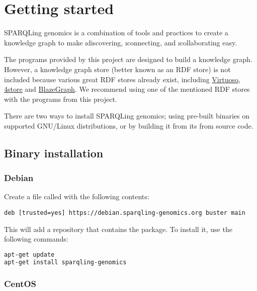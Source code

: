 \chapter{Getting started}

  SPARQLing genomics is a combination of tools and practices to create a
  knowledge graph to make \i{discovering}, \i{connecting}, and
  \i{collaborating} easy.

  The programs provided by this project are designed to build a knowledge graph.
  However, a knowledge graph store (better known as an RDF store) is not included
  because various great RDF stores already exist, including
  \href{https://virtuoso.openlinksw.com/}{Virtuoso},
  \href{https://github.com/4store/4store}{4store} and
  \href{https://www.blazegraph.com/}{BlazeGraph}.  We recommend using one of
  the mentioned RDF stores with the programs from this project.

  There are two ways to install SPARQLing genomics; using pre-built binaries
  on supported GNU/Linux distributions, or by building it from its from source
  code.

\section{Binary installation}
\label{sec:binary-installation}

\subsection{Debian}

  Create a file called 
  with the following contents:


\begin{lstlisting}
deb [trusted=yes] https://debian.sparqling-genomics.org buster main
\end{lstlisting}


  This will add a repository that contains the 
  package.  To install it, use the following commands:

\begin{lstlisting}[language=bash]
apt-get update
apt-get install sparqling-genomics
\end{lstlisting}

\subsection{CentOS}

